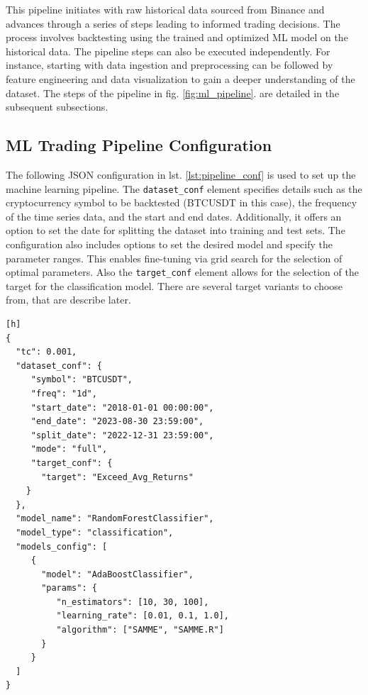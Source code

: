 This pipeline initiates with raw historical data sourced from Binance and advances through a series of steps
leading to informed trading decisions. The process involves backtesting using the trained and optimized ML model on the historical data.
The pipeline steps can also be executed independently.
For instance, starting with data ingestion and preprocessing can be followed by feature engineering and data visualization to gain a deeper understanding of the dataset. The steps of the pipeline in  fig. \ref{fig:ml_pipeline}. are detailed in the subsequent subsections.

\subsection{ML Trading Pipeline Configuration}
The following JSON configuration in lst. \ref{lst:pipeline_conf} is used to set up the machine learning pipeline.
The \texttt{dataset\_conf} element specifies details such as the cryptocurrency symbol to be backtested (BTCUSDT in this case), the frequency of the time series data, and the start and end dates. Additionally, it offers an option to set the date for splitting the dataset into training and test sets.
The configuration also includes options to set the desired model and specify the parameter ranges. This enables fine-tuning via grid search for the selection of optimal parameters.
Also the \texttt{target\_conf} element allows for the selection of the target for the classification model. There are several target variants to choose from, that are describe later.




\begin{lstlisting}[style=jsonstyle, caption={Machine Learning Pipeline Configuration},  captionpos=b, label=lst:pipeline_conf][h]
{
  "tc": 0.001,
  "dataset_conf": {
     "symbol": "BTCUSDT",
     "freq": "1d",
     "start_date": "2018-01-01 00:00:00",
     "end_date": "2023-08-30 23:59:00",
     "split_date": "2022-12-31 23:59:00",
     "mode": "full",
     "target_conf": {
       "target": "Exceed_Avg_Returns"
    }
  },
  "model_name": "RandomForestClassifier",
  "model_type": "classification",
  "models_config": [
     {
       "model": "AdaBoostClassifier",
       "params": {
          "n_estimators": [10, 30, 100],
          "learning_rate": [0.01, 0.1, 1.0],
          "algorithm": ["SAMME", "SAMME.R"]
       }
     }
  ]
}
\end{lstlisting}



